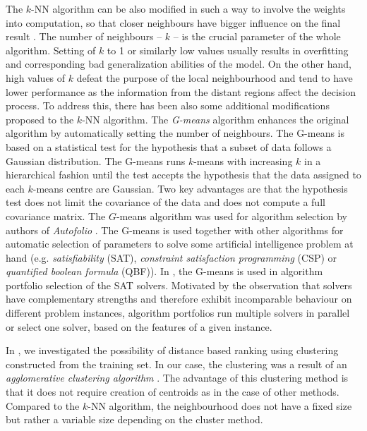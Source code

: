 The $k$-NN algorithm can be also modified in such a way to involve the weights into computation, so that closer neighbours have bigger influence on the final result \cite{weightedKnn}.
The number of neighbours -- $k$ -- is the crucial parameter of the whole algorithm. Setting of $k$ to 1 or similarly low values usually results in overfitting and corresponding bad generalization abilities of the model. On the other hand, high values of $k$ defeat the purpose of the local neighbourhood and tend to have lower performance as the information from the distant regions affect the decision process. To address this, there has been also some additional modifications proposed to the $k$-NN algorithm. The \emph{G-means} algorithm \cite{gmeans} enhances the original algorithm by automatically setting the number of neighbours. The G-means is based on a statistical test for the hypothesis that a subset of data follows a Gaussian distribution. The G-means runs $k$-means with increasing $k$ in a hierarchical fashion until the test accepts the hypothesis that the data assigned to each $k$-means centre are Gaussian. Two key advantages are that the hypothesis test does not limit the covariance of the data and does not compute a full covariance matrix. The $G$-means algorithm was used for algorithm selection by authors of \emph{Autofolio} \cite{FrankHutterAutomaticallyConfiguredAlgorithmSelector}. The G-means is used together with other algorithms for automatic selection of parameters to solve some artificial intelligence problem at hand (e.g. \emph{satisfiability} (SAT), \emph{constraint satisfaction programming} (CSP) or \emph{quantified boolean formula} (QBF)). In \cite{algorithmSelectionAndScheduling}, the G-means is used in algorithm portfolio selection of the SAT solvers. Motivated by the observation that solvers have complementary strengths and therefore exhibit incomparable behaviour on different problem instances, algorithm portfolios run multiple solvers in parallel or select one solver, based on the features of a given instance. 

In \cite{jaICMLA2013}, we investigated the possibility of distance based ranking using clustering constructed from the training set. In our case, the clustering  was a result of an \emph{agglomerative clustering algorithm} \cite{hierarchicalClustering}. The advantage of this clustering method is that it does not require creation of centroids as in the case of other methods. Compared to the $k$-NN algorithm, the neighbourhood does not have a fixed size but rather a variable size depending on the cluster method.

